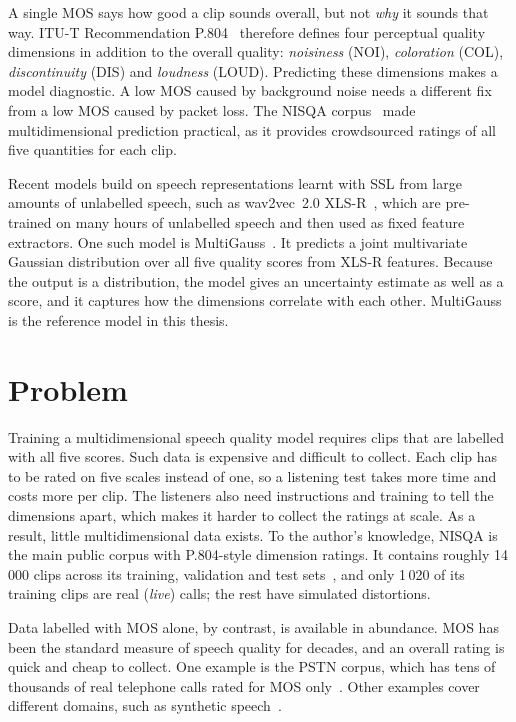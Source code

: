 \documentclass[
english,                 %
bibtex,                  %
includeExtraAbstracts, %
]{kththesis}
\numberwithin{listing}{chapter}
\begin{document}
A single MOS says how good a clip sounds overall, but not \emph{why} it sounds that way. \gls{ITU-T} Recommendation P.804~\cite{itu_p804} therefore defines four perceptual quality dimensions in addition to the overall quality: \emph{noisiness} (NOI), \emph{coloration} (COL), \emph{discontinuity} (DIS) and \emph{loudness} (LOUD). Predicting these dimensions makes a model diagnostic. A low MOS caused by background noise needs a different fix from a low MOS caused by packet loss. The NISQA corpus~\cite{mittag_nisqa_2021} made multidimensional prediction practical, as it provides crowdsourced ratings of all five quantities for each clip.

Recent models build on speech representations learnt with \gls{SSL} from large amounts of unlabelled speech, such as wav2vec~2.0 XLS-R~\cite{babu_xlsr_2022}, which are pre-trained on many hours of unlabelled speech and then used as fixed feature extractors. One such model is MultiGauss~\cite{cumlin_multigauss_2025}. It predicts a joint multivariate Gaussian distribution over all five quality scores from XLS-R features. Because the output is a distribution, the model gives an uncertainty estimate as well as a score, and it captures how the dimensions correlate with each other. MultiGauss is the reference model in this thesis.

\section{Problem}
\label{sec:problem}
\label{sec:researchQuestion}

Training a multidimensional speech quality model requires clips that are labelled with all five scores. Such data is expensive and difficult to collect. Each clip has to be rated on five scales instead of one, so a listening test takes more time and costs more per clip. The listeners also need instructions and training to tell the dimensions apart, which makes it harder to collect the ratings at scale. As a result, little multidimensional data exists. To the author's knowledge, NISQA is the main public corpus with P.804-style dimension ratings. It contains roughly 14\,000 clips across its training, validation and test sets~\cite{mittag_nisqa_2021}, and only 1\,020 of its training clips are real (\emph{live}) calls; the rest have simulated distortions.

Data labelled with MOS alone, by contrast, is available in abundance. MOS has been the standard measure of speech quality for decades, and an overall rating is quick and cheap to collect. One example is the PSTN corpus, which has tens of thousands of real telephone calls rated for MOS only~\cite{mittag_pstn_2020}. Other examples cover different domains, such as synthetic speech~\cite{cooper_ssw_2021}.
\end{document}
